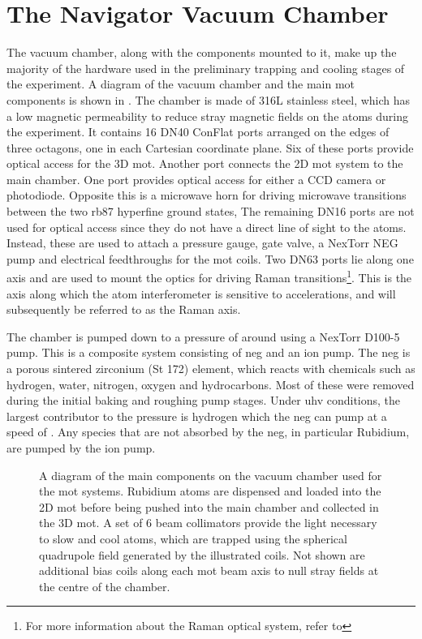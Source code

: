 \section{The Navigator Vacuum Chamber}\label{sec:vacuum_chamber}
The vacuum chamber, along with the components mounted to it, make up the
majority of the hardware used in the preliminary trapping and cooling stages of
the experiment. A diagram of the
vacuum chamber and the main \ac{mot} components is shown in
. The chamber is made of 316L stainless steel, which has a low magnetic permeability to reduce stray magnetic fields on the atoms during the experiment.  It contains 16 DN40 ConFlat ports arranged
on the edges of three octagons, one in each Cartesian coordinate plane. Six of
these ports provide optical access for the 3D \ac{mot}. Another port connects the 2D \ac{mot} system to the main chamber. One port provides optical access for either a CCD camera or photodiode. Opposite this is a microwave horn for driving microwave transitions between the two \ac{rb87} hyperfine ground states, The remaining DN16 ports are not used for optical access since
they do not have a direct line of sight to the atoms. Instead, these are used to attach a pressure gauge, gate valve, a NexTorr NEG pump and electrical feedthroughs for the \ac{mot} coils. Two DN63
ports lie along one axis and are used to mount the optics for driving Raman transitions\footnote{For more information about the Raman optical system,
refer to }. This is the axis along which the atom interferometer is sensitive to
accelerations, and will subsequently be referred to as the Raman axis. \par\noindent  The chamber is pumped down to a pressure of around
\sivalue{}{\milli\bar} using a NexTorr D100-5 pump. This is a
composite system consisting of \ac{neg} and an ion pump. The \ac{neg} is a
porous sintered zirconium (St 172) element, which reacts with chemicals such as
hydrogen, water, nitrogen, oxygen and hydrocarbons. Most of these were removed
during the initial baking and roughing pump stages. Under \ac{uhv} conditions,
the largest contributor to the pressure is hydrogen which the \ac{neg} can pump
at a speed of . Any species that are not
absorbed by the \ac{neg}, in particular Rubidium, are pumped by the
 ion pump.
\begin{figure}[!htbp]
	\centering
	\def\svgwidth{1\textwidth}
	
	\caption[\ac{mot} system component diagram]{A diagram of the main components on the vacuum chamber used for the \ac{mot}
		systems. Rubidium atoms are dispensed and loaded into the 2D \ac{mot}
		before being pushed into the main chamber and collected in the 3D
		\ac{mot}. A set of 6 beam collimators provide the light necessary to
		slow and cool atoms, which are trapped using the spherical quadrupole
		field generated by the illustrated coils. Not shown are additional bias
		coils along each \ac{mot} beam axis to null stray fields at the centre
		of the chamber.}
	\label{fig:mot_system}
\end{figure}
